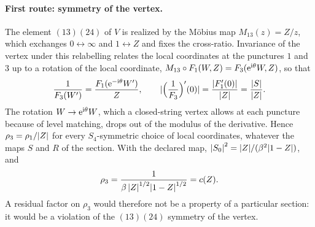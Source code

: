 \paragraph{First route: symmetry of the vertex.}
The element $(13)(24)$ of $V$ is realized by the Möbius map $M_{13}(z) = Z / z$, which exchanges $0 \leftrightarrow \infty$ and $1 \leftrightarrow Z$ and fixes the cross-ratio.
Invariance of the vertex under this relabelling relates the local coordinates at the punctures $1$ and $3$ up to a rotation of the local coordinate, $M_{13} \circ F_1(W, Z) = F_3(\mathrm{e}^{\mathrm{i} \theta} W, Z)$, so that
\begin{equation}
  \frac{1}{F_3(W')}
    = \frac{F_1(\mathrm{e}^{- \mathrm{i} \theta} W')}{Z},
  \qquad
  {|\Big( \frac{1}{F_3} \Big)'(0)|}
    = \frac{{|F_1'(0)|}}{{|Z|}}
    = \frac{{|S|}}{{|Z|}}.
\end{equation}
The rotation $W \to \mathrm{e}^{\mathrm{i} \theta} W$, which a closed-string vertex allows at each puncture because of level matching, drops out of the modulus of the derivative.
Hence $\rho_3 = \rho_1 / {|Z|}$ for every $S_4$-symmetric choice of local coordinates, whatever the maps $S$ and $R$ of the section.
With the declared map, ${|S_0|}^2 = {|Z|} / (\beta^2 {|1 - Z|})$, and
\begin{equation}
  \rho_3
    = \frac{1}{\beta \, {|Z|}^{1/2} {|1 - Z|}^{1/2}}
    = c(Z).
\end{equation}
A residual factor on $\rho_3$ would therefore not be a property of a particular section: it would be a violation of the $(13)(24)$ symmetry of the vertex.

